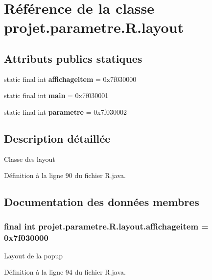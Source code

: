 \section{\-Référence de la classe projet.\-parametre.\-R.\-layout}
\label{classprojet_1_1parametre_1_1_r_1_1layout}
\subsection*{\-Attributs publics statiques}
\begin{DoxyCompactItemize}
\item 
static final int {\bf affichageitem} = 0x7f030000
\item 
static final int {\bf main} = 0x7f030001
\item 
static final int {\bf parametre} = 0x7f030002
\end{DoxyCompactItemize}


\subsection{\-Description détaillée}
\-Classe des layout 

\-Définition à la ligne 90 du fichier \-R.\-java.



\subsection{\-Documentation des données membres}
\subsubsection[{affichageitem}]{\setlength{\rightskip}{0pt plus 5cm}final int {\bf projet.\-parametre.\-R.\-layout.\-affichageitem} = 0x7f030000\hspace{0.3cm}{\ttfamily  [static]}}\label{classprojet_1_1parametre_1_1_r_1_1layout_ad22ef9997b82a638b87ab4bdd32e99e6}
\-Layout de la popup 

\-Définition à la ligne 94 du fichier \-R.\-java.

